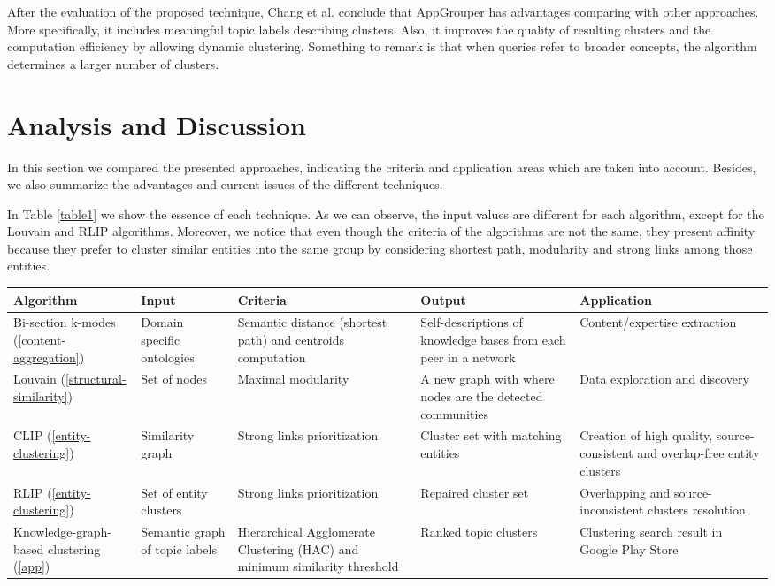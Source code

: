 \documentclass[runningheads]{llncs}
\begin{document}
After the evaluation of the proposed technique, Chang et al. \cite{Chang} conclude that AppGrouper has advantages comparing with other approaches. More specifically, it includes meaningful topic labels describing clusters. Also, it improves the quality of resulting clusters and the computation efficiency by allowing dynamic clustering. Something to remark is that when queries refer to broader concepts, the algorithm determines a larger number of clusters.

\section{Analysis and Discussion} \label{analysis}
In this section we compared the presented approaches, indicating the criteria and application areas which are taken into account. Besides, we also summarize the advantages and current issues of the different techniques.

In Table \ref{table1} we show the essence of each technique. As we can observe, the input values are different for each algorithm, except for the Louvain and RLIP algorithms. Moreover, we notice that even though the criteria of the algorithms are not the same, they present affinity because they prefer to cluster similar entities into the same group by considering shortest path, modularity and strong links among those entities.

 \label{table1}
\begin{tabular}{|p{2cm}|p{2.3cm}|p{3.5cm}|p{3.5cm}|p{3.5cm}|}
 \hline
\textbf{Algorithm} & \textbf{Input} & \textbf{Criteria} & \textbf{Output} & \textbf{Application}\\
 \hline
 Bi-section k-modes (\ref{content-aggregation}) & Domain specific ontologies & Semantic distance (shortest path) and centroids computation & Self-descriptions of knowledge bases from each peer in a network & Content/expertise extraction \\
 \hline
 Louvain (\ref{structural-similarity}) & Set of nodes & Maximal modularity & A new graph with where nodes are the detected communities & Data exploration and discovery\\
 \hline
 CLIP (\ref{entity-clustering}) & Similarity graph & Strong links prioritization & Cluster set with matching entities & Creation of high quality, source-consistent and overlap-free entity clusters \\
 \hline
 RLIP (\ref{entity-clustering}) & Set of entity clusters & Strong links prioritization & Repaired cluster set & Overlapping and source-inconsistent clusters resolution \\
 \hline
 Knowledge-graph-based clustering (\ref{app}) & Semantic graph of topic labels & Hierarchical Agglomerate Clustering (HAC) and minimum similarity threshold & Ranked topic clusters & Clustering search result in Google Play Store \\
 \hline
\end{tabular}
\end{document}
